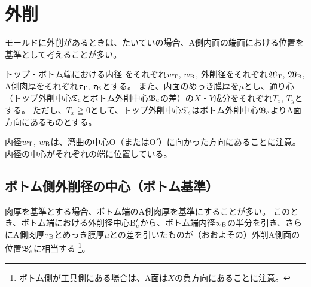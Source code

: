 \chapter{外削}
モールドに外削があるときは、たいていの場合、A側内面の端面における位置を基準として考えることが多い。

トップ・ボトム端における内径
をそれぞれ$w_\text T$, $w_\text B$, 外削径をそれぞれ$\mathfrak W_\text T$, $\mathfrak W_\text B$, A側肉厚をそれぞれ$\tau_\text T$, $\tau_\text B$とする。
また、内面のめっき膜厚を$\mu$とし、通り心（トップ外削中心$\mathfrak T_\text c$とボトム外削中心$\mathfrak B_\text c$の差）の$X$・$Y$成分をそれぞれ$T_x$, $T_y$とする。
ただし、$T_x \geqq 0$として、トップ外削中心$\mathfrak T_\text c$はボトム外削中心$\mathfrak B_\text c$よりA面方向にあるものとする。
\begin{hosokubox}
内径$w_\text T$, $w_\text B$は、湾曲の中心O（またはO$'$）に向かった方向にあることに注意。
内径の中心がそれぞれの端に位置している。
\end{hosokubox}



\section{ボトム側外削径の中心（ボトム基準）}
肉厚を基準とする場合、ボトム端のA側肉厚を基準にすることが多い。
このとき、ボトム端における外削径中心B$_\text c'$から、ボトム端内径$w_\text B$の半分を引き、さらにA側肉厚$\tau_\text B$とめっき膜厚$\mu$との差を引いたものが（おおよその）外削A側面の位置$\mathfrak B_\text o'$に相当する
\footnote{ボトム側が工具側にある場合は、A面は$X$の負方向にあることに注意。}。


